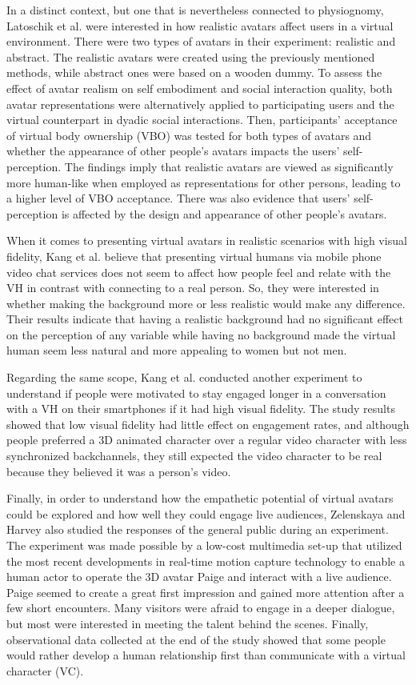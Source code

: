 In a distinct context, but one that is nevertheless connected to physiognomy, Latoschik et al. \cite{LAT17} were interested in how realistic avatars affect users in a virtual environment. There were two types of avatars in their experiment: realistic and abstract. The realistic avatars were created using the previously mentioned methods, while abstract ones were based on a wooden dummy. To assess the effect of avatar realism on self embodiment and social interaction quality, both avatar representations were alternatively applied to participating users and the virtual counterpart in dyadic social interactions. Then, participants' acceptance of virtual body ownership (VBO) was tested for both types of avatars and whether the appearance of other people's avatars impacts the users' self-perception. The findings imply that realistic avatars are viewed as significantly more human-like when employed as representations for other persons, leading to a higher level of VBO acceptance. There was also evidence that users' self-perception is affected by the design and appearance of other people's avatars.

When it comes to presenting virtual avatars in realistic scenarios with high visual fidelity, Kang et al. \cite{KAN16} believe that presenting virtual humans via mobile phone video chat services does not seem to affect how people feel and relate with the VH in contrast with connecting to a real person. So, they were interested in whether making the background more or less realistic would make any difference. Their results indicate that having a realistic background had no significant effect on the perception of any variable while having no background made the virtual human seem less natural and more appealing to women but not men.

Regarding the same scope, Kang et al. \cite{KAN16A} conducted another experiment to understand if people were motivated to stay engaged longer in a conversation with a VH on their smartphones if it had high visual fidelity. The study results showed that low visual fidelity had little effect on engagement rates, and although people preferred a 3D animated character over a regular video character with less synchronized backchannels, they still expected the video character to be real because they believed it was a person's video.

Finally, in order to understand how the empathetic potential of virtual avatars could be explored and how well they could engage live audiences, Zelenskaya and Harvey \cite{ZEL19} also studied the responses of the general public during an experiment. The experiment was made possible by a low-cost multimedia set-up that utilized the most recent developments in real-time motion capture technology to enable a human actor to operate the 3D avatar Paige and interact with a live audience. Paige seemed to create a great first impression and gained more attention after a few short encounters. Many visitors were afraid to engage in a deeper dialogue, but most were interested in meeting the talent behind the scenes. Finally, observational data collected at the end of the study showed that some people would rather develop a human relationship first than communicate with a virtual character (VC).

